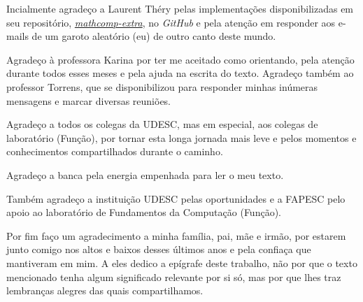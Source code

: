 \begin{agradecimentos}
	Incialmente agradeço a Laurent Théry pelas implementações disponibilizadas em seu repositório, \hyperlink{https://github.com/thery/mathcomp-extra/}{\textit{mathcomp-extra}}, no \textit{GitHub} e pela atenção em responder aos e-mails de um garoto aleatório (eu) de outro canto deste mundo.

	Agradeço à professora Karina por ter me aceitado como orientando, pela atenção durante todos esses meses e pela ajuda na escrita do texto. Agradeço também ao professor Torrens, que se disponibilizou para responder minhas inúmeras mensagens e marcar diversas reuniões.

	Agradeço a todos os colegas da UDESC, mas em especial, aos colegas de laboratório (Função), por tornar esta longa jornada mais leve e pelos momentos e conhecimentos compartilhados durante o caminho.

	
	Agradeço a banca pela energia empenhada para ler o meu texto.
	
	Também agradeço a instituição UDESC pelas oportunidades e a FAPESC pelo apoio ao laboratório de Fundamentos da Computação (Função). 

	Por fim faço um agradecimento a minha família, pai, mãe e irmão, por estarem junto comigo nos altos e baixos desses últimos anos e pela confiaça que mantiveram em mim. A eles dedico a epígrafe deste trabalho, não por que o texto mencionado tenha algum significado relevante por si só, mas por que lhes traz lembranças alegres das quais compartilhamos.
\end{agradecimentos}


